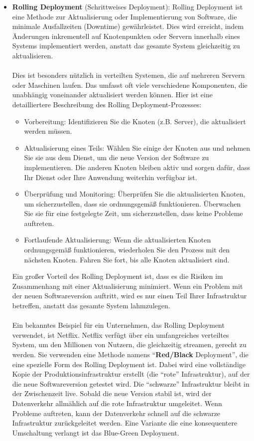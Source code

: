 \begin{itemize} 
\item \textbf{Rolling Deployment} (Schrittweises Deployment):
Rolling Deployment ist eine Methode zur Aktualisierung oder Implementierung von Software, die minimale Ausfallzeiten (Downtime) gewährleistet. Dies wird erreicht, indem Änderungen inkrementell auf Knotenpunkten oder Servern innerhalb eines Systems implementiert werden, anstatt das gesamte System gleichzeitig zu aktualisieren.
\\\\
Dies ist besonders nützlich in verteilten Systemen, die auf mehreren Servern oder Maschinen laufen. Das umfasst oft viele verschiedene Komponenten, die unabhängig voneinander aktualisiert werden können.
Hier ist eine detailliertere Beschreibung des Rolling Deployment-Prozesses:
\begin{itemize} 
\item Vorbereitung: Identifizieren Sie die Knoten (z.B. Server), die aktualisiert werden müssen.
\item Aktualisierung eines Teils: Wählen Sie einige der Knoten aus und nehmen Sie sie aus dem Dienst, um die neue Version der Software zu implementieren. Die anderen Knoten bleiben aktiv und sorgen dafür, dass Ihr Dienst oder Ihre Anwendung weiterhin verfügbar ist.
\item Überprüfung und Monitoring: Überprüfen Sie die aktualisierten Knoten, um sicherzustellen, dass sie ordnungsgemäß funktionieren. Überwachen Sie sie für eine festgelegte Zeit, um sicherzustellen, dass keine Probleme auftreten.
\item Fortlaufende Aktualisierung: Wenn die aktualisierten Knoten ordnungsgemäß funktionieren, wiederholen Sie den Prozess mit den nächsten Knoten. Fahren Sie fort, bis alle Knoten aktualisiert sind.
\end{itemize} 
Ein großer Vorteil des Rolling Deployment ist, dass es die Risiken im Zusammenhang mit einer Aktualisierung minimiert. Wenn ein Problem mit der neuen Softwareversion auftritt, wird es nur einen Teil Ihrer Infrastruktur betreffen, anstatt das gesamte System lahmzulegen.
\\\\
Ein bekanntes Beispiel für ein Unternehmen, das Rolling Deployment verwendet, ist Netflix. Netflix verfügt über ein umfangreiches verteiltes System, um den Millionen von Nutzern, die gleichzeitig streamen, gerecht zu werden. Sie verwenden eine Methode namens \enquote{\textbf{Red/Black} Deployment}, die eine spezielle Form des Rolling Deployment ist. Dabei wird eine vollständige Kopie der Produktionsinfrastruktur erstellt (die \enquote{rote} Infrastruktur), auf der die neue Softwareversion getestet wird. Die \enquote{schwarze} Infrastruktur bleibt in der Zwischenzeit live. Sobald die neue Version stabil ist, wird der Datenverkehr allmählich auf die rote Infrastruktur umgeleitet. Wenn Probleme auftreten, kann der Datenverkehr schnell auf die schwarze Infrastruktur zurückgeleitet werden. Eine Variante die eine konsequentere Umschaltung verlangt ist das Blue-Green Deployment.

\end{itemize}
